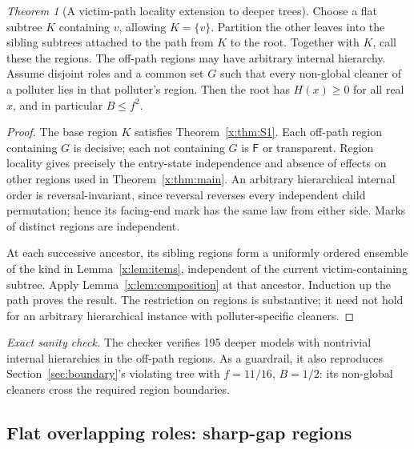 \documentclass[11pt,a4paper]{article}
\theoremstyle{definition}\newtheorem{definition}[theorem]{Definition}
\theoremstyle{remark}\newtheorem{remark}[theorem]{Remark}
\newtheorem{xtheorem}{Theorem}\renewcommand{\thextheorem}{A.\arabic{xtheorem}}
\theoremstyle{definition}\newtheorem{xexample}[xtheorem]{Example}\theoremstyle{plain}
\newcommand{\Fail}{\mathsf F}\newcommand{\Clean}{\mathsf C}\newcommand{\Und}{\mathsf U}
\newcommand{\xcheck}[1]{\par\smallskip\textit{Exact sanity check.} #1\par}
\begin{document}
\begin{xtheorem}[A victim-path locality extension to deeper trees]\label{x:thm:spine}
Choose a flat subtree $K$ containing $v$, allowing $K=\{v\}$. Partition the other leaves into the sibling subtrees attached to the path from $K$ to the root. Together with $K$, call these the regions. The off-path regions may have arbitrary internal hierarchy. Assume disjoint roles and a common set $G$ such that every non-global cleaner of a polluter lies in that polluter's region. Then the root has $H(x)\ge0$ for all real $x$, and in particular $B\le f^2$.
\end{xtheorem}
\begin{proof}
The base region $K$ satisfies Theorem~\ref{x:thm:S1}. Each off-path region containing $G$ is decisive; each not containing $G$ is $\Fail$ or transparent. Region locality gives precisely the entry-state independence and absence of effects on other regions used in Theorem~\ref{x:thm:main}. An arbitrary hierarchical internal order is reversal-invariant, since reversal reverses every independent child permutation; hence its facing-end mark has the same law from either side. Marks of distinct regions are independent.

At each successive ancestor, its sibling regions form a uniformly ordered ensemble of the kind in Lemma~\ref{x:lem:items}, independent of the current victim-containing subtree. Apply Lemma~\ref{x:lem:composition} at that ancestor. Induction up the path proves the result. The restriction on regions is substantive; it need not hold for an arbitrary hierarchical instance with polluter-specific cleaners.
\end{proof}
\xcheck{The checker verifies 195 deeper models with nontrivial internal hierarchies in the off-path regions. As a guardrail, it also reproduces Section~\ref{sec:boundary}'s violating tree with $f=11/16$, $B=1/2$: its non-global cleaners cross the required region boundaries.}

\subsection{Flat overlapping roles: sharp-gap regions}
\end{document}
